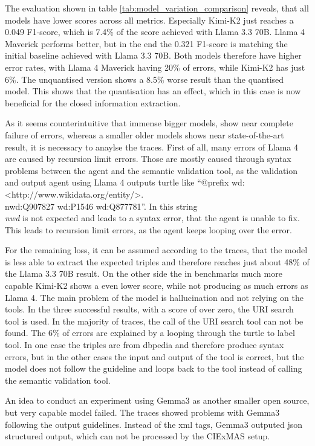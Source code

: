 \documentclass[a4paper,oneside,bibliography=totoc]{scrbook}
\begin{document}
The evaluation shown in table \ref{tab:model_variation_comparison} reveals, that all models have lower scores across all metrics. Especially Kimi-K2 just reaches a 0.049 F1-score, which is 7.4\% of the score achieved with Llama 3.3 70B. Llama 4 Maverick performs better, but in the end the 0.321 F1-score is matching the initial baseline achieved with Llama 3.3 70B. Both models therefore have higher error rates, with Llama 4 Maverick having 20\% of errors, while Kimi-K2 has just 6\%. The unquantised version shows a 8.5\% worse result than the quantised model. This shows that the quantisation has an effect, which in this case is now beneficial for the closed information extraction.

As it seems counterintuitive that immense bigger models, show near complete failure of errors, whereas a smaller older models shows near state-of-the-art result, it is necessary to anaylse the traces. First of all, many errors of Llama 4 are caused by recursion limit errors. Those are mostly caused through syntax problems between the agent and the semantic validation tool, as the validation and output agent using Llama 4 outputs turtle like \enquote{@prefix wd: <http://www.wikidata.org/entity/>.\\nwd:Q907827 wd:P1546 wd:Q877781}. In this string \textit{\\nwd} is not expected and leads to a syntax error, that the agent is unable to fix. This leads to recursion limit errors, as the agent keeps looping over the error.

For the remaining loss, it can be assumed according to the traces, that the model is less able to extract the expected triples and therefore reaches just about 48\% of the Llama 3.3 70B result. On the other side the in benchmarks much more capable Kimi-K2 shows a even lower score, while not producing as much errors as Llama 4. The main problem of the model is hallucination and not relying on the tools. In the three successful results, with a score of over zero, the URI search tool is used. In the majority of traces, the call of the URI search tool can not be found. The 6\% of errors are explained by a looping through the turtle to label tool. In one case the triples are from dbpedia and therefore produce syntax errors, but in the other cases the input and output of the tool is correct, but the model does not follow the guideline and loops back to the tool instead of calling the semantic validation tool.

An idea to conduct an experiment using Gemma3 as another smaller open source, but very capable model failed. The traces showed problems with Gemma3 following the output guidelines. Instead of the xml tags, Gemma3 outputed json structured output, which can not be processed by the CIExMAS setup.
\end{document}
